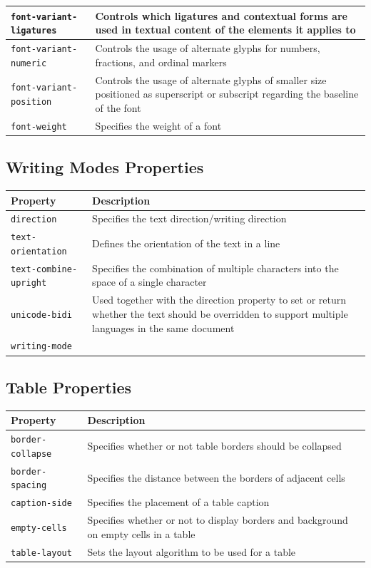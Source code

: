 \documentclass[11pt, letterpaper]{article}
\begin{document}
\begin{longtable}{p{5cm} p{10cm}}
				\texttt{font-variant-ligatures} & Controls which ligatures and contextual forms are used in textual content of the elements it applies to \\\midrule
				\texttt{font-variant-numeric} & Controls the usage of alternate glyphs for numbers, fractions, and ordinal markers \\\midrule
				\texttt{font-variant-position} & Controls the usage of alternate glyphs of smaller size positioned as superscript or subscript regarding the baseline of the font \\\midrule
				\texttt{font-weight} & Specifies the weight of a font \\\midrule
			\end{longtable}

		\subsection{Writing Modes Properties}
			\begin{longtable}{p{5cm} p{10cm}}
				\toprule
				Property & Description \\\midrule 
				\texttt{direction} & Specifies the text direction/writing direction \\\midrule
				\texttt{text-orientation} & Defines the orientation of the text in a line \\\midrule
				\texttt{text-combine-upright} & Specifies the combination of multiple characters into the space of a single character \\\midrule
				\texttt{unicode-bidi} & Used together with the direction property to set or return whether the text should be overridden to support multiple languages in the same document \\\midrule
				\texttt{writing-mode} & \\\midrule
			\end{longtable}

		\subsection{Table Properties}
			\begin{longtable}{p{5cm} p{10cm}}
				\toprule
				Property & Description \\\midrule 
				\texttt{border-collapse} & Specifies whether or not table borders should be collapsed \\\midrule
				\texttt{border-spacing} & Specifies the distance between the borders of adjacent cells \\\midrule
				\texttt{caption-side} & Specifies the placement of a table caption \\\midrule
				\texttt{empty-cells} & Specifies whether or not to display borders and background on empty cells in a table \\\midrule
				\texttt{table-layout} & Sets the layout algorithm to be used for a table \\\midrule
			\end{longtable}
\end{document}
